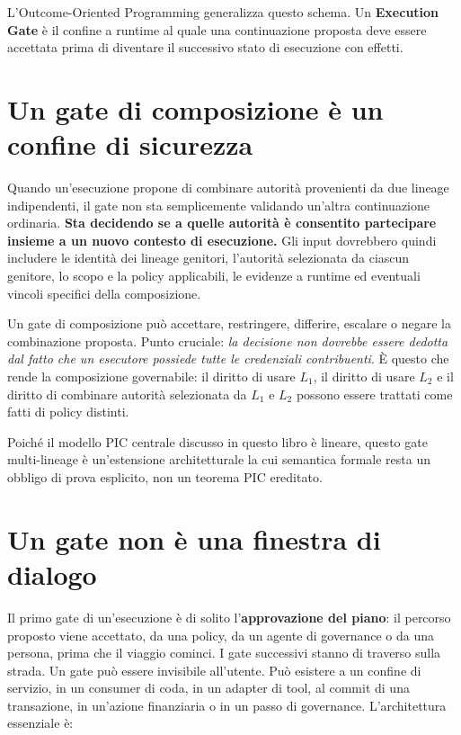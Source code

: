 \documentclass[10pt,oneside,openany]{book}
\newcommand{\term}[1]{\textbf{#1}}
\begin{document}
L'Outcome-Oriented Programming generalizza questo schema. Un \term{Execution Gate} è il confine a runtime al quale una continuazione proposta deve essere accettata prima di diventare il successivo stato di esecuzione con effetti.

\section{Un gate di composizione è un confine di sicurezza}
Quando un'esecuzione propone di combinare autorità provenienti da due lineage indipendenti, il gate non sta semplicemente validando un'altra continuazione ordinaria. \textbf{Sta decidendo se a quelle autorità è consentito partecipare insieme a un nuovo contesto di esecuzione.} Gli input dovrebbero quindi includere le identità dei lineage genitori, l'autorità selezionata da ciascun genitore, lo scopo e la policy applicabili, le evidenze a runtime ed eventuali vincoli specifici della composizione.

Un gate di composizione può accettare, restringere, differire, escalare o negare la combinazione proposta. Punto cruciale: \emph{la decisione non dovrebbe essere dedotta dal fatto che un esecutore possiede tutte le credenziali contribuenti}. È questo che rende la composizione governabile: il diritto di usare $L_1$, il diritto di usare $L_2$ e il diritto di combinare autorità selezionata da $L_1$ e $L_2$ possono essere trattati come fatti di policy distinti.

Poiché il modello PIC centrale discusso in questo libro è lineare, questo gate multi-lineage è un'estensione architetturale la cui semantica formale resta un obbligo di prova esplicito, non un teorema PIC ereditato.

\section{Un gate non è una finestra di dialogo}
Il primo gate di un'esecuzione è di solito l'\term{approvazione del piano}: il percorso proposto viene accettato, da una policy, da un agente di governance o da una persona, prima che il viaggio cominci. I gate successivi stanno di traverso sulla strada. Un gate può essere invisibile all'utente. Può esistere a un confine di servizio, in un consumer di coda, in un adapter di tool, al commit di una transazione, in un'azione finanziaria o in un passo di governance. L'architettura essenziale è:
\end{document}
